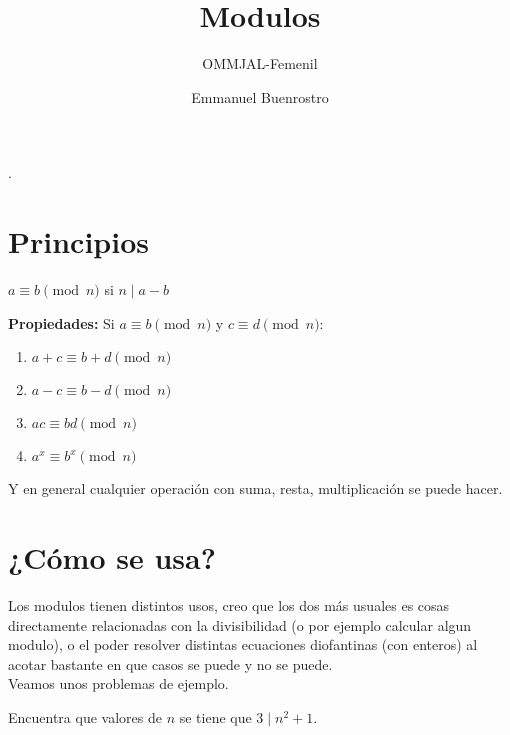 \documentclass[11pt]{scrartcl}
\title{Modulos}
\subtitle{OMMJAL-Femenil}
\author{Emmanuel Buenrostro}
\begin{document}
\maketitle.


\section{Principios}
\begin{definition}
$a \equiv b \pmod n$ si $n\mid a-b$ 
\end{definition}
\textbf{ Propiedades:}
Si $a\equiv b \pmod n$ y $c \equiv d \pmod n$:
\begin{enumerate}
\item $a+c\equiv b+d  \pmod n$
\item $a-c \equiv b-d \pmod n$
\item $ac \equiv bd \pmod n$
\item $a^x\equiv b^x \pmod n$
\end{enumerate}
Y en general cualquier operaci\'on con suma, resta, multiplicaci\'on se puede hacer.

\section{¿C\'omo se usa?}
Los modulos tienen distintos usos, creo que los dos m\'as usuales es cosas directamente relacionadas con la divisibilidad (o por ejemplo calcular algun modulo), o el poder resolver distintas ecuaciones diofantinas (con enteros) al acotar bastante en que casos se puede y no se puede. \\
Veamos unos problemas de ejemplo. 

\begin{example} 
Encuentra que valores de $n$ se tiene que $3 \mid n^2+1$.
\end{example}
\end{document}
